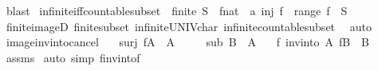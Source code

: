 \begin{isabellebody}
\ blast\isanewline
{}\isamarkupfalse%
%
\endisatagproof
{\isafoldproof}%
%
\isadelimproof
\isanewline
%
\endisadelimproof
\isanewline
{}\isamarkupfalse%
\ infinite{\isacharunderscore}{\kern0pt}iff{\isacharunderscore}{\kern0pt}countable{\isacharunderscore}{\kern0pt}subset{\isacharcolon}{\kern0pt}\ {\isachardoublequoteopen}{\isasymnot}\ finite\ S\ {\isasymlongleftrightarrow}\ {\isacharparenleft}{\kern0pt}{\isasymexists}f{\isacharcolon}{\kern0pt}{\isacharcolon}{\kern0pt}nat\ {\isasymRightarrow}\ {\isacharprime}{\kern0pt}a{\isachardot}{\kern0pt}\ inj\ f\ {\isasymand}\ range\ f\ {\isasymsubseteq}\ S{\isacharparenright}{\kern0pt}{\isachardoublequoteclose}\isanewline
\ \ %
\isanewline
%
\isadelimproof
\ \ %
\endisadelimproof
%
\isatagproof
{}\isamarkupfalse%
\ finite{\isacharunderscore}{\kern0pt}imageD\ finite{\isacharunderscore}{\kern0pt}subset\ infinite{\isacharunderscore}{\kern0pt}UNIV{\isacharunderscore}{\kern0pt}char{\isacharunderscore}{\kern0pt}{}\ infinite{\isacharunderscore}{\kern0pt}countable{\isacharunderscore}{\kern0pt}subset\ \isamarkupfalse%
\ auto%
\endisatagproof
{\isafoldproof}%
%
\isadelimproof
\isanewline
%
\endisadelimproof
\isanewline
{}\isamarkupfalse%
\ image{\isacharunderscore}{\kern0pt}inv{\isacharunderscore}{\kern0pt}into{\isacharunderscore}{\kern0pt}cancel{\isacharcolon}{\kern0pt}\isanewline
\ \ \ surj{\isacharcolon}{\kern0pt}\ {\isachardoublequoteopen}f{\isacharbackquote}{\kern0pt}A\ {\isacharequal}{\kern0pt}\ A{\isacharprime}{\kern0pt}{\isachardoublequoteclose}\isanewline
\ \ \ \ \ sub{\isacharcolon}{\kern0pt}\ {\isachardoublequoteopen}B{\isacharprime}{\kern0pt}\ {\isasymsubseteq}\ A{\isacharprime}{\kern0pt}{\isachardoublequoteclose}\isanewline
\ \ \ {\isachardoublequoteopen}f\ {\isacharbackquote}{\kern0pt}{\isacharparenleft}{\kern0pt}{\isacharparenleft}{\kern0pt}inv{\isacharunderscore}{\kern0pt}into\ A\ f{\isacharparenright}{\kern0pt}{\isacharbackquote}{\kern0pt}B{\isacharprime}{\kern0pt}{\isacharparenright}{\kern0pt}\ {\isacharequal}{\kern0pt}\ B{\isacharprime}{\kern0pt}{\isachardoublequoteclose}\isanewline
%
\isadelimproof
\ \ %
\endisadelimproof
%
\isatagproof
{}\isamarkupfalse%
\ assms\isanewline
{}\isamarkupfalse%
\ {\isacharparenleft}{\kern0pt}auto\ simp{\isacharcolon}{\kern0pt}\ f{\isacharunderscore}{\kern0pt}inv{\isacharunderscore}{\kern0pt}into{\isacharunderscore}{\kern0pt}f{\isacharparenright}{\kern0pt}\isanewline

\end{isabellebody}
